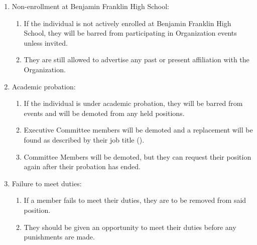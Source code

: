 \begin{enumerate}
	\item Non-enrollment at Benjamin Franklin High School:
		\begin{enumerate}
			\item If the individual is not actively enrolled at Benjamin Franklin High
				School, they will be barred from participating in Organization events
				unless invited.

			\item They are still allowed to advertise any past or present affiliation with
				the Organization.
		\end{enumerate}

	\item Academic probation:
		\begin{enumerate}
			\item If the individual is under academic probation, they will be barred
				from events and will be demoted from any held positions.

			\item Executive Committee members will be demoted and a replacement will be
				found as described by their job title ().

			\item Committee Members will be demoted, but they can request their
				position again after their probation has ended.
		\end{enumerate}

	\item Failure to meet duties:
		\begin{enumerate}
			\item If a member fails to meet their duties, they are to be removed from
				said position.

			\item They should be given an opportunity to meet their duties before any punishments
				are made.
		\end{enumerate}
\end{enumerate}

